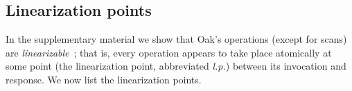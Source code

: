 \subsection{Linearization points}
\label{sec:lp}

In the supplementary material we show that Oak's operations (except for scans) are \emph{linearizable}~\cite{linearizability}; that is, every operation appears to take place atomically at some point (the linearization point, abbreviated \emph{l.p.}) between its invocation and response.
We now list the linearization points.


\newenvironment{desc}%
  {\begin{description}%
      \setlength{\partopsep}{0pt}%
      \setlength{\topsep}{0pt}%
    \setlength{\itemsep}{0pt}%
    \setlength{\parsep}{0pt}}%
  {\end{description}}

